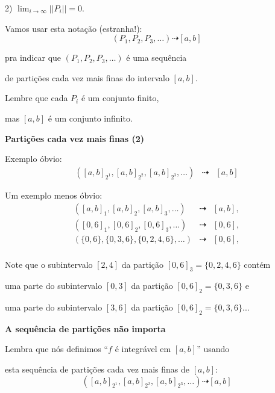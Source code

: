 \documentclass[oneside,12pt]{article}
\begin{document}
2) $\lim_{i→∞} ||P_i|| = 0$.

\msk

Vamos usar esta notação (estranha!):
%
$$(P_1, P_2, P_3, \ldots) \dashrightarrow [a,b]$$

pra indicar que $(P_1, P_2, P_3, \ldots)$ é uma sequência

de partições cada vez mais finas do intervalo $[a,b]$.

\msk

Lembre que cada $P_i$ é um conjunto finito,

mas $[a,b]$ é um conjunto infinito.


\newpage


{\bf Partições cada vez mais finas (2)}

\ssk

Exemplo óbvio:
%
$$\begin{array}{rcl}
  ([a,b]_{2^1},
   [a,b]_{2^2},
   [a,b]_{2^3},
   \ldots) &\dashrightarrow& [a,b]
  \end{array}
$$

Um exemplo menos óbvio:
%
$$\begin{array}{rcl}
  ([a,b]_1,
   [a,b]_2,
   [a,b]_3,
   \ldots) &\dashrightarrow& [a,b], \\
  ([0,6]_1,
   [0,6]_2,
   [0,6]_3,
   \ldots) &\dashrightarrow& [0,6], \\
  (\{0,6\},
   \{0,3,6\},
   \{0,2,4,6\},
   \ldots) &\dashrightarrow& [0,6], \\
  \end{array}
$$

Note que o subintervalo $[2,4]$ da partição $[0,6]_3 = \{0,2,4,6\}$ contém

uma parte do subintervalo $[0,3]$ da partição $[0,6]_2 = \{0,3,6\}$ e

uma parte do subintervalo $[3,6]$ da partição $[0,6]_2 = \{0,3,6\}$...

\newpage



{\bf A sequência de partições não importa}

\ssk

Lembra que nós definimos ``$f$ é integrável em $[a,b]$'' usando

esta sequência de partições cada vez mais finas de $[a,b]$:
%
$$([a,b]_{2^1},
   [a,b]_{2^2},
   [a,b]_{2^3},
   \ldots) \dashrightarrow [a,b]
$$
\end{document}
